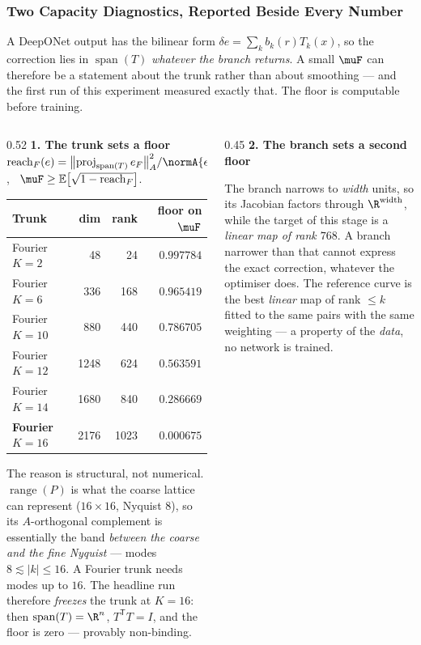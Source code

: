 \frametitle{Two Capacity Diagnostics, Reported Beside Every Number}
\footnotesize

A DeepONet output has the bilinear form $\delta e=\sum_k b_k(r)T_k(x)$, so the correction
lies in $\operatorname{span}(T)$ \emph{whatever the branch returns}. A small $\muF$ can
therefore be a statement about the trunk rather than about smoothing --- and the first run
of this experiment measured exactly that. \alert{The floor is computable before training.}

\begin{columns}[T]
\begin{column}{0.52\textwidth}
\centering
\textbf{1. The trunk sets a floor} \quad
$\operatorname{reach}_F(e)=\bigl\|\operatorname{proj}_{\operatorname{span}(T)}e_F
\bigr\|_A^2/\normA{e_F}^2$, \ $\muF\ge\mathbb{E}\bigl[\sqrt{1-\operatorname{reach}_F}\bigr]$.

\vspace{1mm}
{\scriptsize
\begin{tabular}{@{}lrrr@{}}
\toprule
Trunk & dim & rank & floor on $\muF$ \\
\midrule
Fourier $K=2$ & 48 & 24 & $0.997784$ \\
Fourier $K=6$ & 336 & 168 & $0.965419$ \\
Fourier $K=10$ & 880 & 440 & $0.786705$ \\
Fourier $K=12$ & 1248 & 624 & $0.563591$ \\
Fourier $K=14$ & 1680 & 840 & $0.286669$ \\
\textbf{Fourier $K=16$} & 2176 & 1023 & \textbf{$0.000675$} \\
\bottomrule
\end{tabular}}

\vspace{1mm}
\raggedright
The reason is structural, not numerical. $\operatorname{range}(P)$ is what the coarse
lattice can represent ($16\times16$, Nyquist $8$), so its $A$-orthogonal complement is
essentially the band \emph{between the coarse and the fine Nyquist} --- modes
$8\lesssim|k|\le16$. A Fourier trunk needs modes up to $16$. The headline run therefore
\emph{freezes} the trunk at $K=16$: then $\operatorname{span}(T)=\R^n$, $T^{\mathsf T}T=I$,
and the floor is \alert{zero} --- provably non-binding.
\end{column}
\begin{column}{0.45\textwidth}
\centering
\textbf{2. The branch sets a second floor}

\raggedright
The branch narrows to \emph{width} units, so its Jacobian factors through
$\R^{\text{width}}$, while the target of this stage is a \emph{linear map of rank $768$}.
A branch narrower than that cannot express the exact correction, whatever the optimiser
does. The reference curve is the best \emph{linear} map of rank $\le k$ fitted to the same
pairs with the same weighting --- a property of the \emph{data}, no network is trained.


\end{column}
\end{columns}
